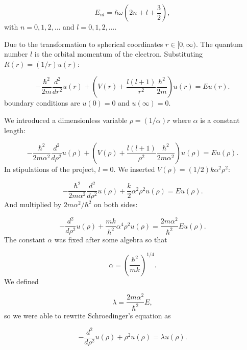 \documentclass[%
reprint,
superscriptaddress,
showpacs,
nofootinbib,
bibnotes,amsmath,amssymb,aps,
prc, 
]{revtex4-1}
\begin{document}
\begin{equation*}
	E_{nl}=  \hbar \omega \left(2n+l+\frac{3}{2}\right),
\end{equation*}
with $n=0,1,2,\dots$ and $l=0,1,2,\dots$.

Due to the transformation to spherical coordinates
$r\in [0,\infty)$.  
The quantum number
$l$ is the orbital momentum of the electron.  
% 
Substituting $R(r) = (1/r) u(r)$:
% 

\begin{equation*}
	-\frac{\hbar^2}{2 m} \frac{d^2}{dr^2} u(r) 
	+ \left ( V(r) + \frac{l (l + 1)}{r^2}\frac{\hbar^2}{2 m}
	\right ) u(r)  = E u(r) .
\end{equation*}
% 
boundary conditions are $u(0)=0$ and $u(\infty)=0$.

We introduced a dimensionless variable $\rho = (1/\alpha) r$
where $\alpha$ is a constant length:
% 

\begin{equation*}
	-\frac{\hbar^2}{2 m \alpha^2} \frac{d^2}{d\rho^2} u(\rho) 
	+ \left ( V(\rho) + \frac{l (l + 1)}{\rho^2}
	\frac{\hbar^2}{2 m\alpha^2} \right ) u(\rho)  = E u(\rho) .
\end{equation*}
% 
In stipulations of the project, $l=0$.
We inserted $V(\rho) = (1/2) k \alpha^2\rho^2$:

\begin{equation*}
	-\frac{\hbar^2}{2 m \alpha^2} \frac{d^2}{d\rho^2} u(\rho) 
	+ \frac{k}{2} \alpha^2\rho^2u(\rho)  = E u(\rho) .
\end{equation*}
And multiplied by $2m\alpha^2/\hbar^2$ on both sides:

\begin{equation*}
	-\frac{d^2}{d\rho^2} u(\rho) 
	+ \frac{mk}{\hbar^2} \alpha^4\rho^2u(\rho)  = \frac{2m\alpha^2}{\hbar^2}E u(\rho) .
\end{equation*}
The constant $\alpha$ was fixed after some algebra
so that


\begin{equation*}
	\alpha = \left(\frac{\hbar^2}{mk}\right)^{1/4}.
\end{equation*}
We defined

\begin{equation*}
	\lambda = \frac{2m\alpha^2}{\hbar^2}E,
\end{equation*}
so we were able to rewrite Schroedinger's equation as

\begin{equation*}
	-\frac{d^2}{d\rho^2} u(\rho) + \rho^2u(\rho)  = \lambda u(\rho) .
\end{equation*}
\end{document}
